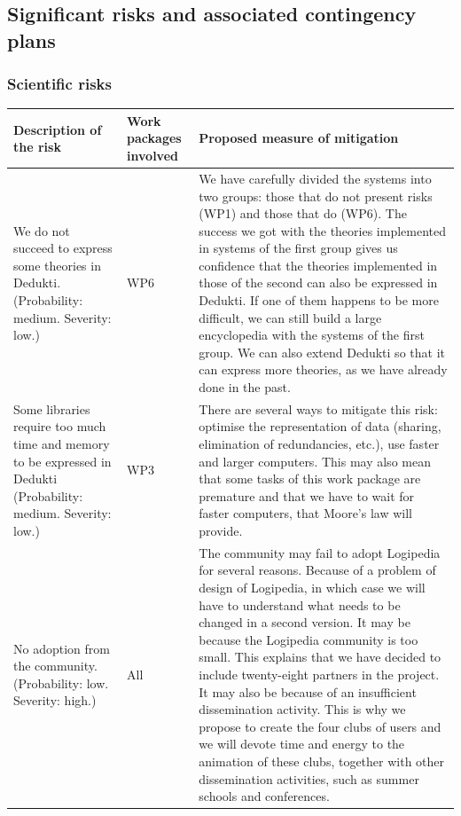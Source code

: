 \subsection*{Significant risks and associated contingency plans}
\label{sec:risks}

\subsubsection*{Scientific risks}

\begin{longtable*}{|p{0.30\textwidth}|p{0.10\textwidth}|p{0.50\textwidth}|}
\hline
{\bf Description of the risk}
&
{\bf Work packages involved}
&
{\bf Proposed measure of mitigation}
\\
\hline
We do not succeed to express some theories in Dedukti.
(Probability: medium. Severity: low.)

&
WP6
&
We have carefully divided the systems into two groups: those that do not
present risks (WP1) and those that do (WP6). The success we got with the
theories implemented in systems of the first group gives us confidence
that the theories implemented in those of the second can also be
expressed in Dedukti.  If one of them happens to be more difficult, we
can still build a large encyclopedia with the systems of the first
group. We can also extend Dedukti so that it can express more theories,
as we have already done in the past.
\\
\hline
Some libraries require too much time and memory
to be expressed in Dedukti (Probability: medium. Severity: low.)
&
WP3
&
There are several ways to mitigate this risk: optimise the
representation of data (sharing, elimination of redundancies, etc.), 
use faster and larger computers. This may also mean that some tasks
of this work package are premature and that we have to wait for
faster computers, that Moore's law will provide.
\\
\hline
No adoption from the community. (Probability: low. Severity: high.)
&
All 
&
The community may fail to adopt Logipedia for several reasons. Because
of a problem of design of Logipedia, in which case we will have to
understand what needs to be changed in a second version.  It may be
because the Logipedia community is too small.  This explains that we
have decided to include twenty-eight partners in the project.  It may
also be because of an insufficient dissemination activity.  This is
why we propose to create the four clubs of users and we will devote
time and energy to the animation of these clubs, together with other
dissemination activities, such as summer schools and conferences.
\\
\hline
\end{longtable*}


